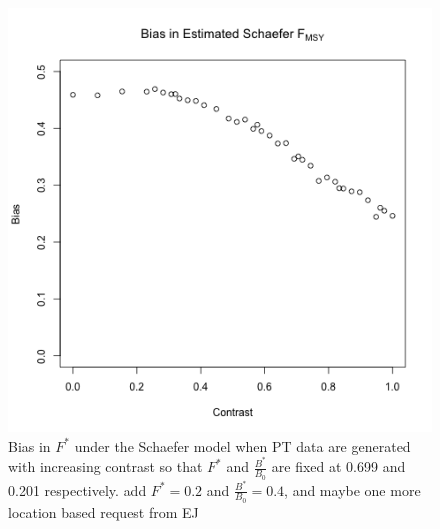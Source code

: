 %
\begin{figure}
\begin{minipage}[h!]{0.49\textwidth}
\includegraphics[width=\textwidth]{../ptNew/contrastTest.png}
\end{minipage}
\begin{minipage}[h!]{0.49\textwidth}
\caption{
Bias in $F^*$ under the Schaefer model when PT data are generated
with increasing contrast so that $F^*$ and $\frac{B^*}{B_0}$ are fixed at
0.699 and 0.201 respectively. 
{\color{red} add $F^*=0.2$ and $\frac{B^*}{B_0}=0.4$, and maybe one more location based request from EJ}
\label{conTest}}
\end{minipage}
\end{figure}

